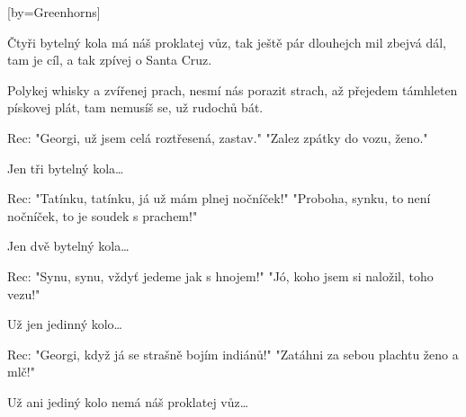 [by={Greenhorns}]

\beginverse{}
Čtyři bytelný kola
má náš proklatej vůz,
tak ještě pár dlouhejch mil
zbejvá dál, tam je cíl,
a tak zpívej o Santa Cruz.
\endverse{}

\beginchorus{}
Polykej whisky a zvířenej prach,
nesmí nás porazit strach,
až přejedem támhleten pískovej plát,
tam nemusíš se, už rudochů bát.
\endchorus{}

\beginverse*{}
Rec: "Georgi, už jsem celá roztřesená, zastav."
"Zalez zpátky do vozu, ženo."
\endverse{}

\beginchorus{}
Jen tři bytelný kola\ldots{}

\endchorus{}

\beginverse*{}
Rec: "Tatínku, tatínku, já už mám plnej nočníček!"
"Proboha, synku, to není nočníček, to je soudek s prachem!"
\endverse{}

\beginchorus{}
Jen dvě bytelný kola\ldots{}

\endchorus{}

\beginverse*{}
Rec: "Synu, synu, vždyť jedeme jak s hnojem!"
"Jó, koho jsem si naložil, toho vezu!"
\endverse{}

\beginchorus{}
Už jen jedinný kolo\ldots{}

\endchorus{}

\beginverse*{}
Rec: "Georgi, když já se strašně bojím indiánů!"
"Zatáhni za sebou plachtu ženo a mlč!"
\endverse{}

\beginchorus{}
Už ani jediný kolo nemá náš proklatej vůz\ldots{}

\endchorus{}

\endsong{}
